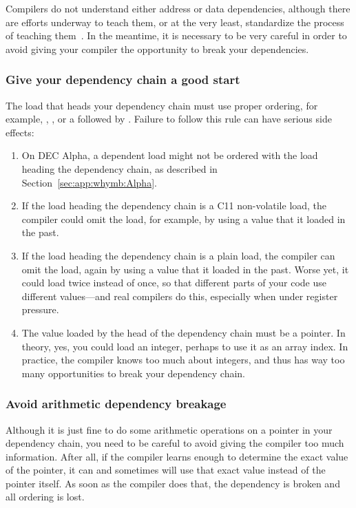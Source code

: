 Compilers do not understand either address or data dependencies,
although there are efforts underway to teach them, or at the very
least, standardize the process of teaching
them~\cite{PaulEMcKennneyConsumeP0190R0,PaulEMcKenney2017markconsumeP0462R1}.
In the meantime, it is necessary to be very careful in order to avoid
giving your compiler the opportunity to break your dependencies.

\subsubsection{Give your dependency chain a good start}
The load that heads your dependency chain must use proper
ordering, for example, ,
, or
a  followed by .
Failure to follow this rule can have serious side effects:

\begin{enumerate}
\item	On DEC Alpha, a dependent load might not be ordered with
	the load heading the dependency chain, as described in
	Section~\ref{sec:app:whymb:Alpha}.
\item	If the load heading the dependency chain is a
	C11 non-volatile  load,
	the compiler could omit the load, for example, by using a value
	that it loaded in the past.
\item	If the load heading the dependency chain is a plain load,
	the compiler can omit the load, again by using a value
	that it loaded in the past.
	Worse yet, it could load twice instead of once, so that
	different parts of your code use different values---and
	real compilers do this, especially when under register
	pressure.
\item	The value loaded by the head of the dependency chain must
	be a pointer.
	In theory, yes, you could load an integer, perhaps to use
	it as an array index.
	In practice, the compiler knows too much about integers,
	and thus has way too many opportunities to break your
	dependency chain.
\end{enumerate}

\subsubsection{Avoid arithmetic dependency breakage}
Although it is just fine to do some arithmetic operations on a pointer in
your dependency chain, you need to be careful to avoid giving the
compiler too much information.
After all, if the compiler learns enough to determine the exact value
of the pointer, it can and sometimes will use that exact value instead
of the pointer itself.
As soon as the compiler does that, the dependency is broken and all
ordering is lost.

